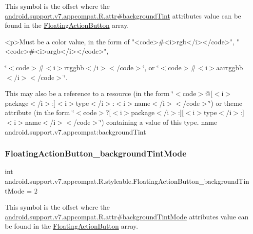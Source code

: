 This symbol is the offset where the \hyperlink{classandroid_1_1support_1_1v7_1_1appcompat_1_1R_1_1attr_a6bf6c479f7c0fccd735ef4b8cd293ceb}{android.\+support.\+v7.\+appcompat.\+R.\+attr\#background\+Tint} attribute\textquotesingle{}s value can be found in the \hyperlink{classandroid_1_1support_1_1v7_1_1appcompat_1_1R_1_1styleable_a9bfca89352160169125a89277e9fb2a1}{Floating\+Action\+Button} array.

\begin{DoxyVerb}      <p>Must be a color value, in the form of "<code>#<i>rgb</i></code>", "<code>#<i>argb</i></code>",
\end{DoxyVerb}
 \char`\"{}$<$code$>$\#$<$i$>$rrggbb$<$/i$>$$<$/code$>$\char`\"{}, or \char`\"{}$<$code$>$\#$<$i$>$aarrggbb$<$/i$>$$<$/code$>$\char`\"{}. 

This may also be a reference to a resource (in the form \char`\"{}$<$code$>$@\mbox{[}$<$i$>$package$<$/i$>$\+:\mbox{]}$<$i$>$type$<$/i$>$\+:$<$i$>$name$<$/i$>$$<$/code$>$\char`\"{}) or theme attribute (in the form \char`\"{}$<$code$>$?\mbox{[}$<$i$>$package$<$/i$>$\+:\mbox{]}\mbox{[}$<$i$>$type$<$/i$>$\+:\mbox{]}$<$i$>$name$<$/i$>$$<$/code$>$\char`\"{}) containing a value of this type.  name android.\+support.\+v7.\+appcompat\+:background\+Tint \mbox{\label{classandroid_1_1support_1_1v7_1_1appcompat_1_1R_1_1styleable_ab01d5ebdb493f8bb1f9595ee05409bfb}} 
\subsubsection{\texorpdfstring{Floating\+Action\+Button\+\_\+background\+Tint\+Mode}{FloatingActionButton\_backgroundTintMode}}
{\footnotesize\ttfamily int android.\+support.\+v7.\+appcompat.\+R.\+styleable.\+Floating\+Action\+Button\+\_\+background\+Tint\+Mode = 2\hspace{0.3cm}{\ttfamily [static]}}

This symbol is the offset where the \hyperlink{classandroid_1_1support_1_1v7_1_1appcompat_1_1R_1_1attr_a11663679360aa87a90983ccadc18c5ee}{android.\+support.\+v7.\+appcompat.\+R.\+attr\#background\+Tint\+Mode} attribute\textquotesingle{}s value can be found in the \hyperlink{classandroid_1_1support_1_1v7_1_1appcompat_1_1R_1_1styleable_a9bfca89352160169125a89277e9fb2a1}{Floating\+Action\+Button} array.

